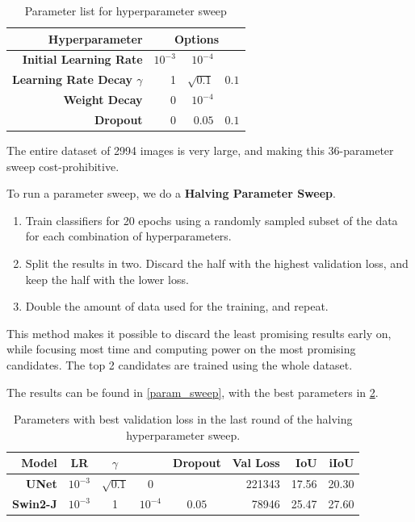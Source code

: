 \begin{table}[h]
	\centering
	\small
	\begin{tabular}{>{\bfseries}r | r r r}
		\toprule
		Hyperparameter & \multicolumn{3}{c}{Options} \\
		\midrule
		Initial Learning Rate & $10^{-3}$ & $10^{-4}$ & \\
		Learning Rate Decay $\gamma$ & 1 & $\sqrt{0.1}$ & $0.1$ \\
		\lt{} Weight Decay & $0$ & $10^{-4}$ & \\
		Dropout & 0 & $0.05$ & $0.1$ \\
		\bottomrule
	\end{tabular}
	\caption{Parameter list for hyperparameter sweep}
	\label{hyperparameter_list}
\end{table}

The entire dataset of 2994 images is very large, and making this 36-parameter sweep cost-prohibitive.

To run a parameter sweep, we do a \textbf{Halving Parameter Sweep}\cite{halving_param_sweep}.
\begin{enumerate}
	\item Train classifiers for 20 epochs using a randomly sampled subset of the data for each combination of hyperparameters.
	\item Split the results in two. Discard the half with the highest validation loss, and keep the half with the lower loss.
	\item Double the amount of data used for the training, and repeat.
\end{enumerate}

This method makes it possible to discard the least promising results early on, while focusing most time and computing power on the most promising candidates.
The top 2 candidates are trained using the whole dataset.

The results can be found in \cref{param_sweep}, with the best parameters in \cref{param_sweep_results}.

\begin{table}[h]
	\centering
	\small
	\begin{tabular}{>{\bfseries}r | c c c c | r r r}
		\toprule
		Model & LR & $\gamma$ & \lt{} & Dropout & Val Loss & IoU & iIoU \\
		\midrule
		UNet & $10^{-3}$ & $\sqrt{0.1}$ & $0$ & & \num{221343} & 17.56 & 20.30 \\
		Swin2-J & $10^{-3}$ & 1 & $10^{-4}$ & $0.05$ & \num{78946} & 25.47 & 27.60 \\
		\bottomrule
	\end{tabular}
	\caption{Parameters with best validation loss in the last round of the halving hyperparameter sweep.}
	\label{param_sweep_results}
\end{table}

